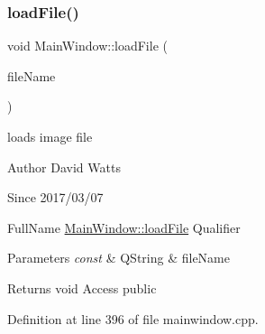 \subsubsection{\texorpdfstring{load\+File()}{loadFile()}}
{\footnotesize\ttfamily void Main\+Window\+::load\+File (\begin{DoxyParamCaption}\item[{const Q\+String \&}]{file\+Name }\end{DoxyParamCaption})}

loads image file

\begin{DoxyAuthor}{Author}
David Watts 
\end{DoxyAuthor}
\begin{DoxySince}{Since}
2017/03/07
\end{DoxySince}
Full\+Name \hyperlink{class_main_window_aa08469ed5c8396e60fa44bae6530bcf1}{Main\+Window\+::load\+File} Qualifier 
\begin{DoxyParams}{Parameters}
{\em const} & Q\+String \& file\+Name \\
\hline
\end{DoxyParams}
\begin{DoxyReturn}{Returns}
void Access public 
\end{DoxyReturn}


Definition at line 396 of file mainwindow.\+cpp.

